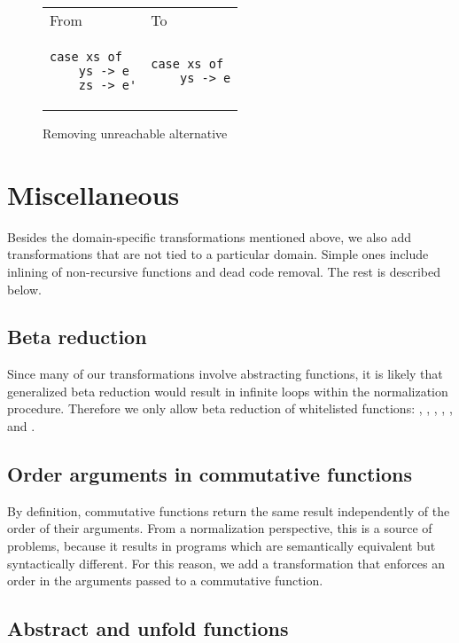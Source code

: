 \begin{figure}
\centering
\begin{tabular}{>{\centering\arraybackslash}m{8em} >{\centering\arraybackslash}m{8em} }
From & To \\
\begin{verbatim}
case xs of
    ys -> e
    zs -> e'
\end{verbatim}
& \begin{verbatim}
case xs of
    ys -> e
\end{verbatim}
\end{tabular}
\caption{Removing unreachable alternative}
\label{fig:patterns-remove-unreachable-alt}
\end{figure}

\section{Miscellaneous}

Besides the domain-specific transformations mentioned above, we also add transformations that are not tied to a particular domain. Simple ones include inlining of non-recursive functions and dead code removal. The rest is described below.

\subsection{Beta reduction}

Since many of our transformations involve abstracting functions, it is likely that generalized beta reduction would result in infinite loops within the normalization procedure. Therefore we only allow beta reduction of whitelisted functions: , , \haskell{++}, , ,  and .

\subsection{Order arguments in commutative functions}

By definition, commutative functions return the same result independently of the order of their arguments. From a normalization perspective, this is a source of problems, because it results in programs which are semantically equivalent but syntactically different. For this reason, we add a transformation that enforces an order in the arguments passed to a commutative function.

\subsection{Abstract and unfold functions}

